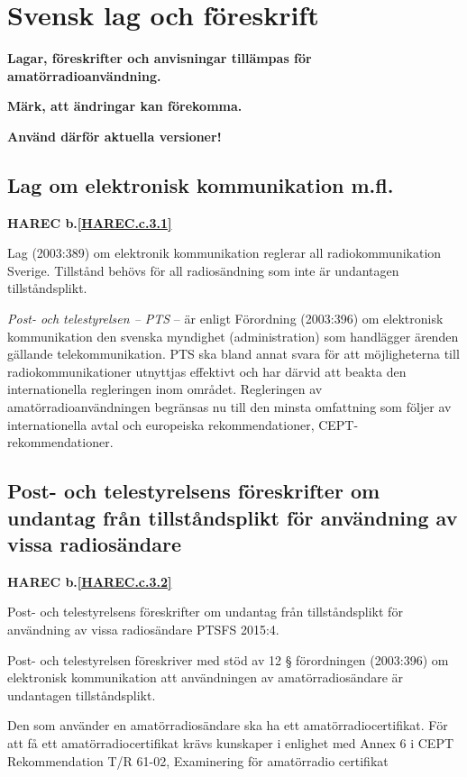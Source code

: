 \section{Svensk lag och föreskrift}

\textbf{Lagar, föreskrifter och anvisningar tillämpas för
  amatörradioanvändning.}

\textbf{Märk, att ändringar kan förekomma.}

\textbf{Använd därför aktuella versioner!}


\subsection{Lag om elektronisk kommunikation m.fl.}
\textbf{
HAREC b.\ref{HAREC.c.3.1}\label{myHAREC.c.3.1}
}

Lag (2003:389) om elektronik kommunikation reglerar all radiokommunikation Sverige. Tillstånd behövs för all radiosändning som inte är undantagen
tillståndsplikt.

\emph{Post- och telestyrelsen -- PTS} -- är enligt Förordning (2003:396) om
elektronisk kommunikation den svenska myndighet (administration) som handlägger
ärenden gällande telekommunikation. PTS ska bland annat svara för att
möjligheterna till radiokommunikationer utnyttjas effektivt och har därvid att
beakta den internationella regleringen inom området. Regleringen av
amatörradioanvändningen begränsas nu till den minsta omfattning som
följer av internationella avtal och europeiska rekommendationer,
CEPT-rekommendationer.

\subsection{Post- och telestyrelsens föreskrifter om undantag från tillståndsplikt för användning av vissa radiosändare}
\textbf{
HAREC b.\ref{HAREC.c.3.2}\label{myHAREC.c.3.2}
}

Post- och telestyrelsens föreskrifter om undantag från tillståndsplikt för
användning av vissa radiosändare PTSFS 2015:4.

Post- och telestyrelsen föreskriver med stöd av 12 § förordningen (2003:396)
om elektronisk kommunikation att användningen av amatörradiosändare är
undantagen tillståndsplikt.

Den som använder en amatörradiosändare ska ha ett amatörradiocertifikat. För
att få ett amatörradiocertifikat krävs kunskaper i enlighet med Annex 6 i 
CEPT Rekommendation T/R 61-02, Examinering för amatörradio certifikat

